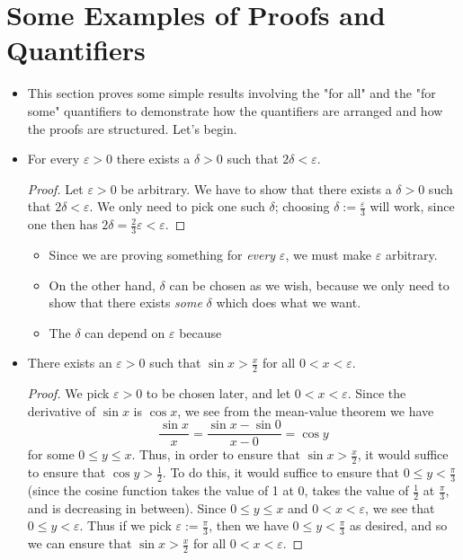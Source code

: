 \documentclass[../main.tex]{subfiles}
\begin{document}
\section{Some Examples of Proofs and Quantifiers}
\begin{itemize}
    \item This section proves some simple results involving the "for all" and the "for some" quantifiers to demonstrate how the quantifiers are arranged and how the proofs are structured. Let's begin.
    \item \leavevmode\vspace{-\dimexpr\baselineskip+\topsep}
    \begin{prp}
        For every $\varepsilon>0$ there exists a $\delta>0$ such that $2\delta<\varepsilon$.
        \begin{proof}
            Let $\varepsilon>0$ be arbitrary. We have to show that there exists a $\delta>0$ such that $2\delta<\varepsilon$. We only need to pick one such $\delta$; choosing $\delta:=\frac{\varepsilon}{3}$ will work, since one then has $2\delta=\frac{2}{3}\varepsilon<\varepsilon$.
        \end{proof}
    \end{prp}
    \begin{itemize}
        \item Since we are proving something for \emph{every} $\varepsilon$, we must make $\varepsilon$ arbitrary.
        \item On the other hand, $\delta$ can be chosen as we wish, because we only need to show that there exists \emph{some} $\delta$ which does what we want.
        \item The $\delta$ can depend on $\varepsilon$ because 
    \end{itemize}
    \item \leavevmode\vspace{-\dimexpr\baselineskip+\topsep}
    \begin{prp}
        There exists an $\varepsilon>0$ such that $\sin x>\frac{x}{2}$ for all $0<x<\varepsilon$.
        \begin{proof}
            We pick $\varepsilon>0$ to be chosen later, and let $0<x<\varepsilon$. Since the derivative of $\sin x$ is $\cos x$, we see from the mean-value theorem we have $$\frac{\sin x}{x}=\frac{\sin x-\sin 0}{x-0}=\cos y$$ for some $0\leq y\leq x$. Thus, in order to ensure that $\sin x>\frac{x}{2}$, it would suffice to ensure that $\cos y>\frac{1}{2}$. To do this, it would suffice to ensure that $0\leq y<\frac{\pi}{3}$ (since the cosine function takes the value of 1 at 0, takes the value of $\frac{1}{2}$ at $\frac{\pi}{3}$, and is decreasing in between). Since $0\leq y\leq x$ and $0<x<\varepsilon$, we see that $0\leq y<\varepsilon$. Thus if we pick $\varepsilon:=\frac{\pi}{3}$, then we have $0\leq y<\frac{\pi}{3}$ as desired, and so we can ensure that $\sin x>\frac{x}{2}$ for all $0<x<\varepsilon$.

\end{proof}
\end{prp}
\end{itemize}
\end{document}
